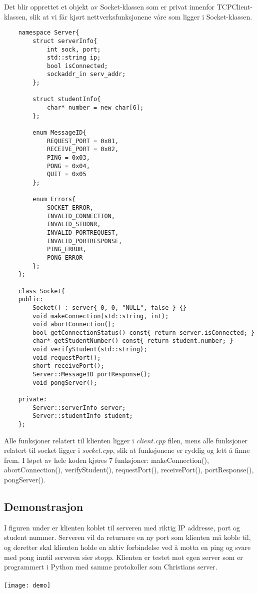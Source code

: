 \newpage
Det blir opprettet et objekt av Socket-klassen som er privat innenfor TCPClient-klassen, slik at vi får kjørt nettverksfunksjonene våre som ligger i Socket-klassen.
\begin{lstlisting}
	namespace Server{
		struct serverInfo{
			int sock, port;
			std::string ip;
			bool isConnected;
			sockaddr_in serv_addr;
		};

		struct studentInfo{
			char* number = new char[6];
		};

		enum MessageID{
			REQUEST_PORT = 0x01,
			RECEIVE_PORT = 0x02,
			PING = 0x03,
			PONG = 0x04,
			QUIT = 0x05
		};

		enum Errors{
			SOCKET_ERROR,
			INVALID_CONNECTION,
			INVALID_STUDNR,
			INVALID_PORTREQUEST,
			INVALID_PORTRESPONSE,
			PING_ERROR,
			PONG_ERROR
		};
	};

	class Socket{
	public:    
		Socket() : server{ 0, 0, "NULL", false } {}
		void makeConnection(std::string, int);
		void abortConnection();
		bool getConnectionStatus() const{ return server.isConnected; }
		char* getStudentNumber() const{ return student.number; }
		void verifyStudent(std::string);
		void requestPort();
		short receivePort();
		Server::MessageID portResponse();
		void pongServer();

	private:
		Server::serverInfo server;
		Server::studentInfo student;
	};
\end{lstlisting}

Alle funksjoner relatert til klienten ligger i \textit{client.cpp} filen, mens alle funksjoner relatert til socket ligger i \textit{socket.cpp}, slik at funksjonene er ryddig og lett å finne frem. I løpet av hele koden kjøres 7 funksjoner: makeConnection(), abortConnection(), verifyStudent(), requestPort(), receivePort(), portResponse(), pongServer().

\subsection{Demonstrasjon}
I figuren under er klienten koblet til serveren med riktig IP addresse, port og student nummer. Serveren vil da returnere en ny port som klienten må koble til, og deretter skal klienten holde en aktiv forbindelse ved å motta en ping og svare med pong inntil serveren sier stopp. Klienten er testet mot egen server som er programmert i Python med samme protokoller som Christians server.\\\\
\texttt{[image: demo]}
